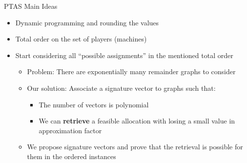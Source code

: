 \begin{frame}[t]{PTAS Main Ideas}
    \begin{itemize}
        \item<2-> Dynamic programming and rounding the values 
        \item<3-> Total order on the set of players (machines)
        \item<4-> Start considering all ``possible assignments'' in the mentioned total order
            \begin{itemize}
                \item<5-> Problem: There are exponentially many \alert{remainder} graphs to consider
                \item<6-> Our solution: Associate a signature vector to graphs such that:
                    \begin{itemize}
                        \item<7-> The number of vectors is polynomial
                        \item<8-> We can \textbf{retrieve} a feasible allocation with losing a small value in approximation factor
                    \end{itemize}
                \item<9-> We \alert{propose} signature vectors and \alert{prove} that the retrieval is possible for them in the ordered instances
            \end{itemize}
    \end{itemize}
\end{frame}     